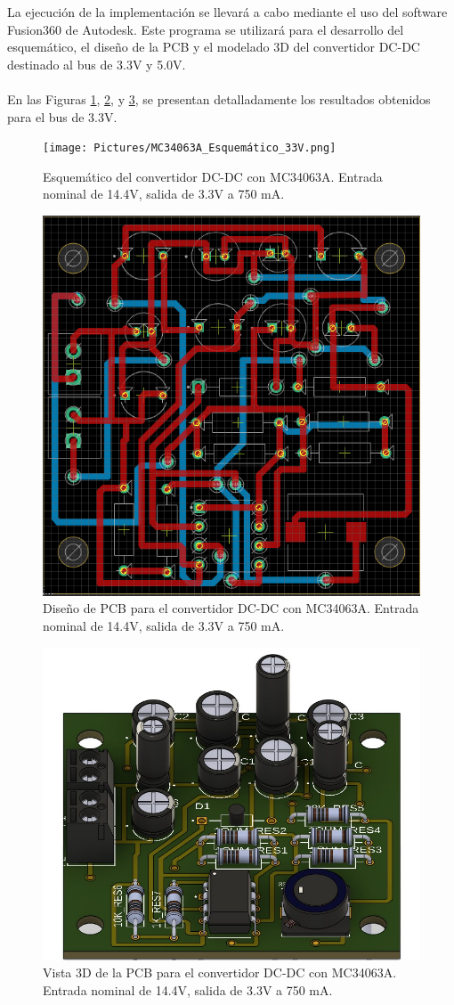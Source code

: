 La ejecución de la implementación se llevará a cabo mediante el uso del software Fusion360 de Autodesk. Este programa se utilizará para el desarrollo del esquemático, el diseño de la PCB y el modelado 3D del convertidor DC-DC destinado al bus de 3.3V y 5.0V.\\\\ En las Figuras \ref{fig:MC34063A_Esquemático_33V}, \ref{fig:MC34063A_PCB_33V}, y \ref{fig:MMC34063A_3D_33V}, se presentan detalladamente los resultados obtenidos para el bus de 3.3V.


\newpage

\begin{figure}[h]
  \centering
  \texttt{[image: Pictures/MC34063A\_Esquemático\_33V.png]} 
  \caption{Esquemático del convertidor DC-DC con MC34063A. Entrada nominal de 14.4V, salida de 3.3V a 750 mA.}
  \label{fig:MC34063A_Esquemático_33V}
\end{figure}

\begin{figure}[h]
  \centering
  \includegraphics[width=0.52\linewidth]{Pictures/MC34063A_PCB_33V.png} 
  \caption{Diseño de PCB para el convertidor DC-DC con MC34063A. Entrada nominal de 14.4V, salida de 3.3V a 750 mA.}
  \label{fig:MC34063A_PCB_33V}
\end{figure}

\newpage

\begin{figure}[h]
  \centering
  \includegraphics[width=0.65\linewidth]{Pictures/MC34063A_3D_33V.jpeg} 
  \caption{Vista 3D de la PCB para el convertidor DC-DC con MC34063A. Entrada nominal de 14.4V, salida de 3.3V a 750 mA.}
  \label{fig:MMC34063A_3D_33V}
\end{figure}

